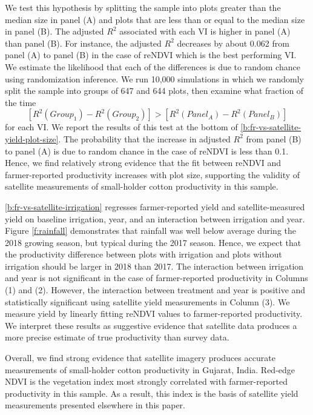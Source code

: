 \documentclass{article}
\begin{document}
We test this hypothesis by splitting the sample into plots greater than the median size in panel (A) and plots that are less than or equal to the median size in panel (B). The adjusted $R^2$ associated with each VI is higher in panel (A) than panel (B). For instance, the adjusted $R^2$ decreases by about 0.062 from panel (A) to panel (B) in the case of reNDVI which is the best performing VI. We estimate the likelihood that each of the differences is due to random chance using randomization inference. We run 10,000 simulations in which we randomly split the sample into groups of 647 and 644 plots, then examine what fraction of the time 
$$[R^2(Group_1) - R^2(Group_2)] > [R^2(Panel_A) - R^2(P anel_B)]$$ 
for each VI. We report the results of this test at the bottom of \ref{b:fr-vs-satellite-yield-plot-size}. The probability that the increase in adjusted $R^2$ from panel (B) to panel (A) is due to random chance in the case of reNDVI is less than 0.1. Hence, we find relatively strong evidence that the fit between reNDVI and farmer-reported productivity increases with plot size, supporting the validity of satellite measurements of small-holder cotton productivity in this sample. 

\ref{b:fr-vs-satellite-irrigation} regresses farmer-reported yield and satellite-measured yield on baseline irrigation, year, and an interaction between irrigation and year. Figure \ref{f:rainfall} demonstrates that rainfall was well below average during the 2018 growing season, but typical during the 2017 season. Hence, we expect that the productivity difference between plots with irrigation and plots without irrigation should be larger in 2018 than 2017. The interaction between irrigation and year is not significant in the case of farmer-reported productivity in Columns (1) and (2). However, the interaction between treatment and year is positive and statistically significant using satellite yield measurements in Column (3). We measure yield by linearly fitting reNDVI values to farmer-reported productivity. We interpret these results as suggestive evidence that satellite data produces a more precise estimate of true productivity than survey data. 

Overall, we find strong evidence that satellite imagery produces accurate measurements of small-holder cotton productivity in Gujarat, India. Red-edge NDVI is the vegetation index most strongly correlated with farmer-reported productivity in this sample. As a result, this index is the basis of satellite yield measurements presented elsewhere in this paper. 
\end{document}

